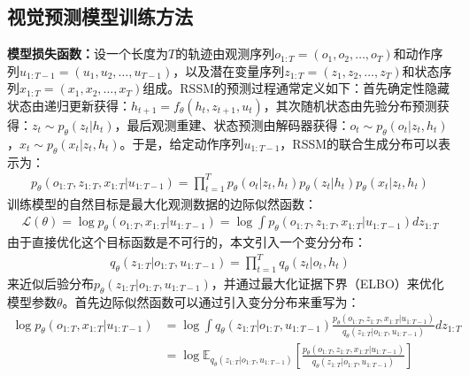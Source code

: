 \subsection{视觉预测模型训练方法}
\textbf{模型损失函数：}设一个长度为$T$的轨迹由观测序列$o_{1:T}=(o_1, o_2, \ldots, o_T)$和动作序列$u_{1:T-1}=(u_1, u_2, \ldots, u_{T-1})$，以及潜在变量序列$z_{1:T}=(z_1, z_2, \ldots, z_T)$和状态序列$x_{1:T}=(x_1, x_2, \ldots, x_T)$组成。RSSM的预测过程通常定义如下：首先确定性隐藏状态由递归更新获得：$h_{t+1} = f_{\theta}(h_t, z_{t+1}, u_t)$，其次随机状态由先验分布预测获得：$z_t \sim p_{\theta}(z_t\vert h_t)$，最后观测重建、状态预测由解码器获得：$o_t \sim p_{\theta}(o_t\vert z_t, h_t)$，$x_t \sim p_{\theta}(x_t\vert z_t, h_t)$。于是，给定动作序列$u_{1:T-1}$，RSSM的联合生成分布可以表示为：
\begin{equation}
    \begin{aligned}
    p_{\theta}(o_{1:T}, z_{1:T}, x_{1:T}\vert u_{1:T-1}) = \prod_{t=1}^T p_{\theta}(o_t\vert z_t, h_t) p_{\theta}(z_t\vert h_t) p_{\theta}(x_t\vert z_t, h_t)
    \end{aligned}\label{equ:likelihood}
\end{equation}
训练模型的自然目标是最大化观测数据的边际似然函数：
\begin{equation}
\begin{aligned}
    \mathcal{L}(\theta) = \log p_{\theta}(o_{1:T}, x_{1:T}\vert u_{1:T-1}) = \log \int p_{\theta}(o_{1:T}, z_{1:T}, x_{1:T}\vert u_{1:T-1}) dz_{1:T}
\end{aligned}
\end{equation}
由于直接优化这个目标函数是不可行的，本文引入一个变分分布：
\begin{equation}
\begin{aligned}
    q_{\theta}(z_{1:T}\vert o_{1:T}, u_{1:T-1})=\prod_{t=1}^T q_{\theta}(z_t\vert o_t, h_t)
\end{aligned}\label{equ:post-variance}
\end{equation}
来近似后验分布$p_{\theta}(z_{1:T}\vert o_{1:T}, u_{1:T-1})$，并通过最大化证据下界（ELBO）来优化模型参数$\theta$。首先边际似然函数可以通过引入变分分布来重写为：
\begin{equation}
\begin{aligned}
    \log p_{\theta}(o_{1:T}, x_{1:T}\vert u_{1:T-1}) &= \log \int q_{\theta}(z_{1:T}\vert o_{1:T}, u_{1:T-1}) \frac{p_{\theta}(o_{1:T}, z_{1:T}, x_{1:T}\vert u_{1:T-1})}{q_{\theta}(z_{1:T}\vert o_{1:T}, u_{1:T-1})} dz_{1:T} \\
    &= \log \mathbb{E}_{q_{\theta}(z_{1:T}\vert o_{1:T}, u_{1:T-1})} \left[ \frac{p_{\theta}(o_{1:T}, z_{1:T}, x_{1:T}\vert u_{1:T-1})}{q_{\theta}(z_{1:T}\vert o_{1:T}, u_{1:T-1})} \right]
\end{aligned}
\end{equation}
